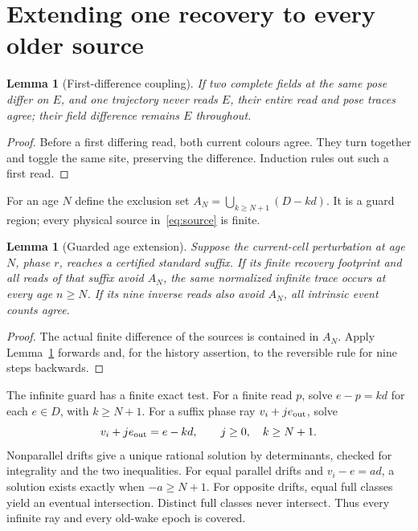 \documentclass[11pt]{article}
\newtheorem{lemma}[theorem]{Lemma}
\begin{document}
\section{Extending one recovery to every older source}
\begin{lemma}[First-difference coupling]\label{lem:coupling}
If two complete fields at the same pose differ on $E$, and one trajectory
never reads $E$, their entire read and pose traces agree; their field
difference remains $E$ throughout.
\end{lemma}
\begin{proof}
Before a first differing read, both current colours agree. They turn together
and toggle the same site, preserving the difference. Induction rules out such
a first read.
\end{proof}
For an age $N$ define the exclusion set $A_N=\bigcup_{k\ge N+1}(D-kd)$.
It is a guard region; every physical source in~\eqref{eq:source} is finite.

\begin{lemma}[Guarded age extension]\label{lem:age}
Suppose the current-cell perturbation at age $N$, phase $r$, reaches a
certified standard suffix. If its finite recovery footprint and all reads
of that suffix avoid $A_N$, the same normalized infinite trace occurs at
every age $n\ge N$. If its nine inverse reads also avoid $A_N$, all intrinsic
event counts agree.
\end{lemma}
\begin{proof}
The actual finite difference of the sources is contained in $A_N$.
Apply Lemma~\ref{lem:coupling} forwards and, for the history assertion,
to the reversible rule for nine steps backwards.
\end{proof}
The infinite guard has a finite exact test. For a finite read $p$, solve
$e-p=kd$ for each $e\in D$, with $k\ge N+1$. For a suffix phase ray
$v_i+je_{\rm out}$, solve
\begin{equation}\label{eq:guard}
 v_i+je_{\rm out}=e-kd,\qquad j\ge0,\quad k\ge N+1.
\end{equation}
Nonparallel drifts give a unique rational solution by determinants, checked
for integrality and the two inequalities. For equal parallel drifts and
$v_i-e=ad$, a solution exists exactly when $-a\ge N+1$. For opposite drifts,
equal full classes yield an eventual intersection. Distinct full classes
never intersect. Thus every infinite ray and every old-wake epoch is covered.
\end{document}
